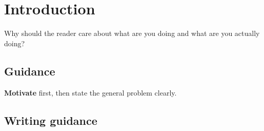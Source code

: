 \documentclass{l4proj}
\begin{document}
\tableofcontents

%
%
%
%
%
%
%
%
\chapter{Introduction}



Why should the reader care about what are you doing and what are you actually doing?
\section{Guidance}

\textbf{Motivate} first, then state the general problem clearly. 

\section{Writing guidance}
\end{document}
